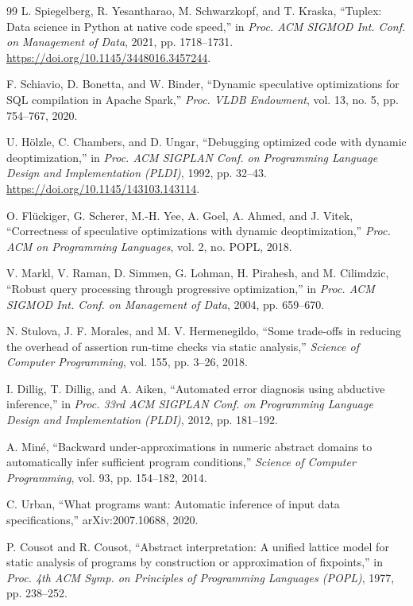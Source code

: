 \begin{thebibliography}{99}
L. Spiegelberg, R. Yesantharao, M. Schwarzkopf, and T. Kraska, ``Tuplex: Data science in Python at
native code speed,'' in \emph{Proc. ACM SIGMOD Int. Conf. on Management of Data}, 2021,
pp. 1718--1731. \url{https://doi.org/10.1145/3448016.3457244}.

F. Schiavio, D. Bonetta, and W. Binder, ``Dynamic speculative optimizations for SQL compilation in
Apache Spark,'' \emph{Proc. VLDB Endowment}, vol. 13, no. 5, pp. 754--767, 2020.

U. H\"olzle, C. Chambers, and D. Ungar, ``Debugging optimized code with dynamic deoptimization,'' in
\emph{Proc. ACM SIGPLAN Conf. on Programming Language Design and Implementation (PLDI)}, 1992,
pp. 32--43. \url{https://doi.org/10.1145/143103.143114}.

O. Fl\"uckiger, G. Scherer, M.-H. Yee, A. Goel, A. Ahmed, and J. Vitek, ``Correctness of speculative
optimizations with dynamic deoptimization,'' \emph{Proc. ACM on Programming Languages}, vol. 2,
no. POPL, 2018.

V. Markl, V. Raman, D. Simmen, G. Lohman, H. Pirahesh, and M. Cilimdzic, ``Robust query processing
through progressive optimization,'' in \emph{Proc. ACM SIGMOD Int. Conf. on Management of Data},
2004, pp. 659--670.

N. Stulova, J. F. Morales, and M. V. Hermenegildo, ``Some trade-offs in reducing the overhead of
assertion run-time checks via static analysis,'' \emph{Science of Computer Programming}, vol. 155,
pp. 3--26, 2018.

I. Dillig, T. Dillig, and A. Aiken, ``Automated error diagnosis using abductive inference,'' in
\emph{Proc. 33rd ACM SIGPLAN Conf. on Programming Language Design and Implementation (PLDI)}, 2012,
pp. 181--192.

A. Min\'e, ``Backward under-approximations in numeric abstract domains to automatically infer
sufficient program conditions,'' \emph{Science of Computer Programming}, vol. 93, pp. 154--182, 2014.

C. Urban, ``What programs want: Automatic inference of input data specifications,''
arXiv:2007.10688, 2020.

P. Cousot and R. Cousot, ``Abstract interpretation: A unified lattice model for static analysis of
programs by construction or approximation of fixpoints,'' in \emph{Proc. 4th ACM Symp. on
Principles of Programming Languages (POPL)}, 1977, pp. 238--252.


\end{thebibliography}
